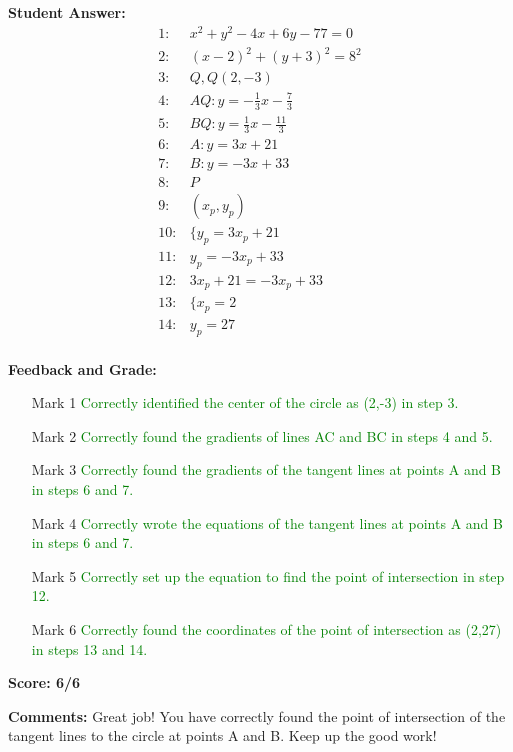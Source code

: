 \documentclass{article}
\begin{document}
\textbf{Student Answer:}
\begin{align*}
1: & x^2+y^2-4x+6y-77=0 \\
2: & (x-2)^2+(y+3)^2=8^2 \\
3: & Q,Q(2,-3) \\
4: & AQ:y=-\frac{1}{3}x-\frac{7}{3} \\
5: & BQ:y=\frac{1}{3}x-\frac{11}{3} \\
6: & A:y=3x+21 \\
7: & B:y=-3x+33 \\
8: & P \\
9: & (x_p,y_p) \\
10: & \{y_p=3x_p+21 \\
11: & y_p=-3x_p+33 \\
12: & 3x_p+21=-3x_p+33 \\
13: & \{x_p=2 \\
14: & y_p=27 \\
\end{align*}

\textbf{Feedback and Grade:}
\begin{itemize}
\item[Mark 1] \textcolor{green}{Correctly identified the center of the circle as (2,-3) in step 3.}
\item[Mark 2] \textcolor{green}{Correctly found the gradients of lines AC and BC in steps 4 and 5.}
\item[Mark 3] \textcolor{green}{Correctly found the gradients of the tangent lines at points A and B in steps 6 and 7.}
\item[Mark 4] \textcolor{green}{Correctly wrote the equations of the tangent lines at points A and B in steps 6 and 7.}
\item[Mark 5] \textcolor{green}{Correctly set up the equation to find the point of intersection in step 12.}
\item[Mark 6] \textcolor{green}{Correctly found the coordinates of the point of intersection as (2,27) in steps 13 and 14.}
\end{itemize}

\textbf{Score: 6/6}

\textbf{Comments:} Great job! You have correctly found the point of intersection of the tangent lines to the circle at points A and B. Keep up the good work!
\end{document}

